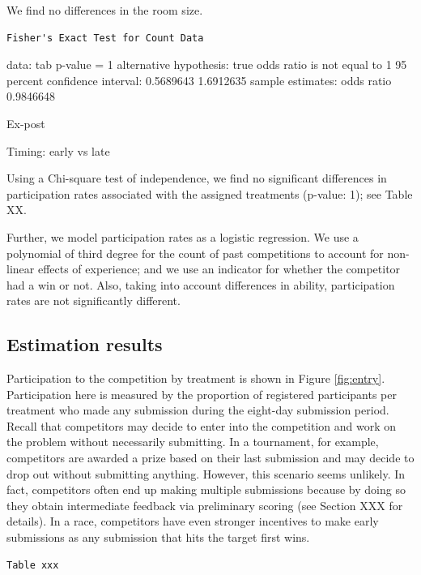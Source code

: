 \documentclass[12pt,]{article}
\theoremstyle{plain} %
\begin{document}
We find no differences in the room size.

\begin{verbatim}
Fisher's Exact Test for Count Data
\end{verbatim}

data: tab p-value = 1 alternative hypothesis: true odds ratio is not
equal to 1 95 percent confidence interval: 0.5689643 1.6912635 sample
estimates: odds ratio 0.9846648

Ex-post

Timing: early vs late

Using a Chi-square test of independence, we find no significant
differences in participation rates associated with the assigned
treatments (p-value: 1); see Table XX.

Further, we model participation rates as a logistic regression. We use a
polynomial of third degree for the count of past competitions to account
for non-linear effects of experience; and we use an indicator for
whether the competitor had a win or not. Also, taking into account
differences in ability, participation rates are not significantly
different.

\subsection{Estimation results}\label{estimation-results}

Participation to the competition by treatment is shown in Figure
\ref{fig:entry}. Participation here is measured by the proportion of
registered participants per treatment who made any submission during the
eight-day submission period. Recall that competitors may decide to enter
into the competition and work on the problem without necessarily
submitting. In a tournament, for example, competitors are awarded a
prize based on their last submission and may decide to drop out without
submitting anything. However, this scenario seems unlikely. In fact,
competitors often end up making multiple submissions because by doing so
they obtain intermediate feedback via preliminary scoring (see Section
XXX for details). In a race, competitors have even stronger incentives
to make early submissions as any submission that hits the target first
wins.

\begin{verbatim}
Table xxx
\end{verbatim}
\end{document}
